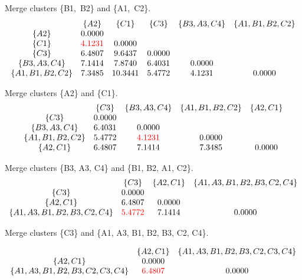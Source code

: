 \documentclass{article}
\begin{document}
Merge clusters \{B1,\ B2\} and \{A1,\ C2\}.
\begin{align*}
    \begin{matrix}
         & \{A2\} & \{C1\} & \{C3\} & \{B3,A3,C4\} & \{A1,B1,B2,C2\} \\
        \{A2\} & 0.0000 \\
        \{C1\} & $\color{red}4.1231$ & 0.0000 \\
        \{C3\} & 6.4807 & 9.6437 & 0.0000 \\
        \{B3,A3,C4\} & 7.1414 & 7.8740 & 6.4031 & 0.0000 \\
        \{A1,B1,B2,C2\} & 7.3485 & 10.3441 & 5.4772 & 4.1231 & 0.0000 \\
    \end{matrix}
\end{align*}

Merge clusters \{A2\} and \{C1\}.
\begin{align*}
    \begin{matrix}
         & \{C3\} & \{B3,A3,C4\} & \{A1,B1,B2,C2\} & \{A2,C1\} \\
        \{C3\} & 0.0000 \\
        \{B3,A3,C4\} & 6.4031 & 0.0000 \\
        \{A1,B1,B2,C2\} & 5.4772 & $\color{red}4.1231$ & 0.0000 \\
        \{A2,C1\} & 6.4807 & 7.1414 & 7.3485 & 0.0000 \\
    \end{matrix}
\end{align*}

Merge clusters \{B3, A3, C4\} and \{B1, B2, A1, C2\}.
\begin{align*}
    \begin{matrix}
         & \{C3\} & \{A2,C1\} & \{A1,A3,B1,B2,B3,C2,C4\} \\
        \{C3\} & 0.0000 \\
        \{A2,C1\} & 6.4807 & 0.0000 \\
        \{A1,A3,B1,B2,B3,C2,C4\} & $\color{red}5.4772$ & 7.1414 & 0.0000 \\
    \end{matrix}
\end{align*}

Merge clusters \{C3\} and \{A1, A3, B1, B2, B3, C2, C4\}.

\begin{align*}
    \begin{matrix}
         & \{A2,C1\} & \{A1,A3,B1,B2,B3,C2,C3,C4\} \\
        \{A2,C1\} & 0.0000 \\
        \{A1,A3,B1,B2,B3,C2,C3,C4\} & $\color{red}6.4807$ & 0.0000 \\
    \end{matrix}
\end{align*}
\end{document}
